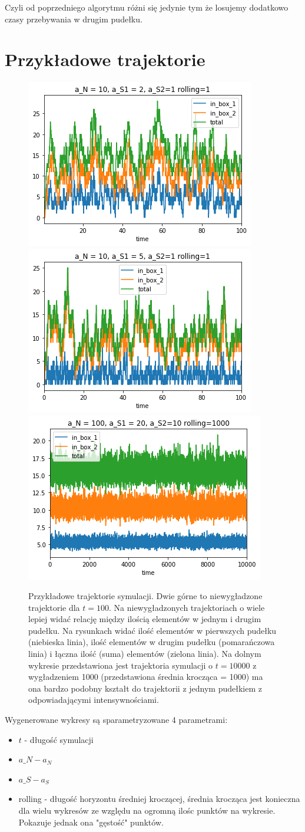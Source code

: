 \documentclass{article}
\begin{document}
Czyli od poprzedniego algorytmu różni się jedynie tym że losujemy dodatkowo czasy przebywania w drugim pudełku.

\section{Przykładowe trajektorie}

\begin{figure}[!htb]
\centering
\includegraphics[width=0.4\linewidth]{10,1,2}
\includegraphics[width=0.4\linewidth]{10,5,1}
\includegraphics[width=0.4\linewidth]{10,20,10,1000}
\caption{Przykładowe trajektorie symulacji. Dwie górne to niewygładzone trajektorie dla $t=100$. Na niewygładzonych trajektoriach o wiele lepiej widać relację między ilością elementów w jednym i drugim pudełku. Na rysunkach widać ilość elementów w pierwszych pudełku (niebieska linia), ilość elementów w drugim pudełku (pomarańczowa linia) i łączna ilość (suma) elementów (zielona linia). Na dolnym wykresie przedstawiona jest trajektoria symulacji o $t=10000$ z wygładzeniem 1000 (przedstawiona średnia krocząca = 1000) ma ona bardzo podobny kształt do trajektorii z jednym pudełkiem z odpowiadającymi intensywnościami.}
\end{figure}
Wygenerowane wykresy są sparametryzowane 4 parametrami: \begin{itemize}
\item $t$ - długość symulacji
\item $a\_N - a_N$
\item $a\_S - a_S$
\item rolling - długość horyzontu średniej kroczącej, średnia krocząca jest konieczna dla wielu wykresów ze względu na ogromną ilośc punktów na wykresie. Pokazuje jednak ona "gęstość" punktów.
\end{itemize}
\newpage
\end{document}
